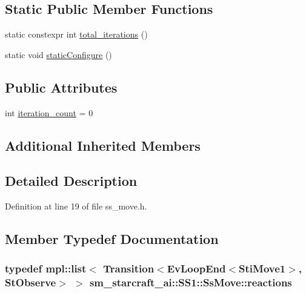 \subsection*{Static Public Member Functions}
\begin{DoxyCompactItemize}
\item 
static constexpr int \hyperlink{structsm__starcraft__ai_1_1SS1_1_1SsMove_a3b53c868a59845bc82e7007e42eb9b88}{total\+\_\+iterations} ()
\item 
static void \hyperlink{structsm__starcraft__ai_1_1SS1_1_1SsMove_ad8d474df3138ce9bd416b0a4bba5081a}{static\+Configure} ()
\end{DoxyCompactItemize}
\subsection*{Public Attributes}
\begin{DoxyCompactItemize}
\item 
int \hyperlink{structsm__starcraft__ai_1_1SS1_1_1SsMove_aece9d76354fedaeb2a3e4af929ee1175}{iteration\+\_\+count} = 0
\end{DoxyCompactItemize}
\subsection*{Additional Inherited Members}


\subsection{Detailed Description}


Definition at line 19 of file ss\+\_\+move.\+h.



\subsection{Member Typedef Documentation}
\subsubsection[{\texorpdfstring{reactions}{reactions}}]{\setlength{\rightskip}{0pt plus 5cm}typedef mpl\+::list$<$ Transition$<$Ev\+Loop\+End$<${\bf Sti\+Move1}$>$, {\bf St\+Observe}$>$ $>$ {\bf sm\+\_\+starcraft\+\_\+ai\+::\+S\+S1\+::\+Ss\+Move\+::reactions}}\hypertarget{structsm__starcraft__ai_1_1SS1_1_1SsMove_a90e75f26213c0f79449f41de81d74836}{}\label{structsm__starcraft__ai_1_1SS1_1_1SsMove_a90e75f26213c0f79449f41de81d74836}


